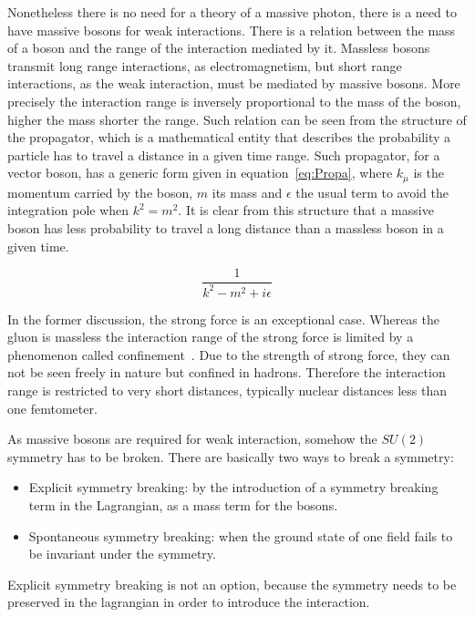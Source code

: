 Nonetheless there is no need for a theory of a massive photon, there is a need to have massive bosons for weak interactions. There is a relation between the mass of a boson and the range of the interaction mediated by it. Massless bosons transmit long range interactions, as electromagnetism, but short range interactions, as the weak interaction, must be mediated by massive bosons. More precisely the interaction range is inversely proportional to the mass of the boson, higher the mass shorter the range. Such relation can be seen from the structure of the propagator, which is a mathematical entity that describes the probability a particle has to travel a distance in a given time range. Such propagator, for a vector boson, has a generic form given in equation~\ref{eq:Propa}, where $k_{\mu}$ is the momentum carried by the boson, $m$ its mass and $\epsilon$ the usual term to avoid the integration pole when $k^{2}=m^{2}$. It is clear from this structure that a massive boson has less probability to travel a long distance than a massless boson in a given time.

\begin{equation}
  \label{eq:Propa}
  \frac{1}{k^{2}-m^{2}+i\epsilon}
\end{equation}

In the former discussion, the strong force is an exceptional case. Whereas the gluon is massless the interaction range of the strong force is limited by a phenomenon called confinement~\cite{Griffiths:2008zz}. Due to the strength of strong force, they can not be seen freely in nature but confined in hadrons. Therefore the interaction range is restricted to very short distances, typically nuclear distances less than one femtometer.

As massive bosons are required for weak interaction, somehow the $SU(2)$ symmetry has to be broken. There are basically two ways to break a symmetry: 
\begin{itemize}
\item Explicit symmetry breaking: by the introduction of a symmetry breaking term in the Lagrangian, as a mass term for the bosons.
\item Spontaneous symmetry breaking: when the ground state of one field fails to be invariant under the symmetry. 
\end{itemize}

Explicit symmetry breaking is not an option, because the symmetry needs to be preserved in the lagrangian in order to introduce the interaction.

